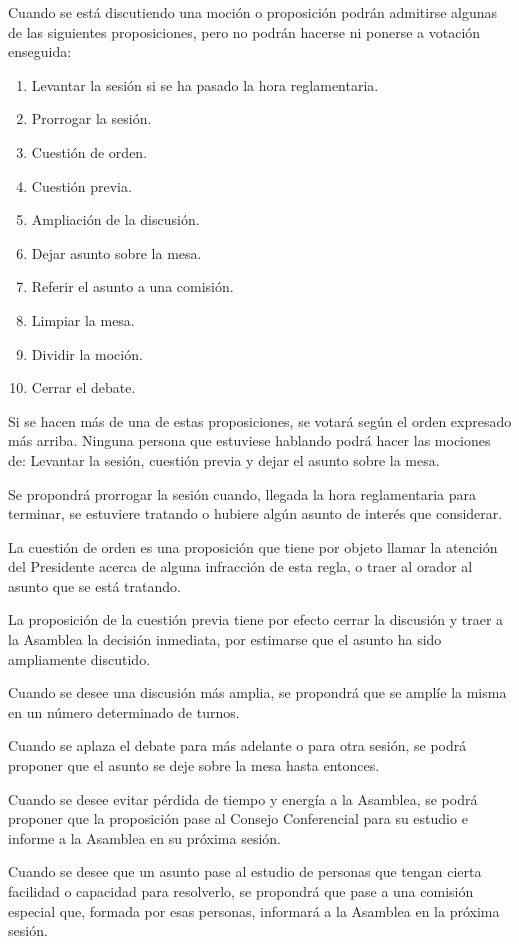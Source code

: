 \article
Cuando se está discutiendo una moción o proposición podrán admitirse algunas de las siguientes proposiciones, pero no podrán hacerse ni ponerse a votación enseguida:
\begin{enumerate}
    \item Levantar la sesión si se ha pasado la hora reglamentaria.
    \item Prorrogar la sesión.
    \item Cuestión de orden.
    \item Cuestión previa.
    \item Ampliación de la discusión.
    \item Dejar asunto sobre la mesa.
    \item Referir el asunto a una comisión.
    \item Limpiar la mesa.
    \item Dividir la moción.
    \item Cerrar el debate.
\end{enumerate}
Si se hacen más de una de estas proposiciones, se votará según el orden expresado más arriba. Ninguna persona que estuviese hablando podrá hacer las mociones de: Levantar la sesión, cuestión previa y dejar el asunto sobre la mesa.

\article
Se propondrá prorrogar la sesión cuando, llegada la hora reglamentaria para terminar, se estuviere tratando o hubiere algún asunto de interés que considerar.

\article
La cuestión de orden es una proposición que tiene por objeto llamar la atención del Presidente acerca de alguna infracción de esta regla, o traer al orador al asunto que se está tratando.

\article
La proposición de la cuestión previa tiene por efecto cerrar la discusión y traer a la Asamblea la decisión inmediata, por estimarse que el asunto ha sido ampliamente discutido.

\article
Cuando se desee una discusión más amplia, se propondrá que se amplíe la misma en un número determinado de turnos.

\article
Cuando se aplaza el debate para más adelante o para otra sesión, se podrá proponer que el asunto se deje sobre la mesa hasta entonces.

\article
Cuando se desee evitar pérdida de tiempo y energía a la Asamblea, se podrá proponer que la proposición pase al Consejo Conferencial para su estudio e informe a la Asamblea en su próxima sesión.

\article
Cuando se desee que un asunto pase al estudio de personas que tengan cierta facilidad o capacidad para resolverlo, se propondrá que pase a una comisión especial que, formada por esas personas, informará a la Asamblea en la próxima sesión.

